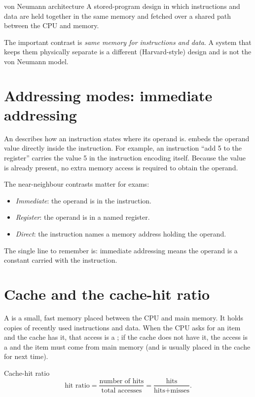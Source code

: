 \begin{definitionbox}{von Neumann architecture}
A stored-program design in which instructions and data are held together in
the same memory and fetched over a shared path between the CPU and memory.
\end{definitionbox}

The important contrast is \emph{same memory for instructions and data}. A
system that keeps them physically separate is a different (Harvard-style)
design and is not the von Neumann model.

\section{Addressing modes: immediate addressing}
An  describes how an instruction states where its
operand is.  embeds the operand value directly
inside the instruction. For example, an instruction ``add 5 to the register''
carries the value 5 in the instruction encoding itself. Because the value is
already present, no extra memory access is required to obtain the operand.

The near-neighbour contrasts matter for exams:
\begin{itemize}
  \item \emph{Immediate}: the operand is in the instruction.
  \item \emph{Register}: the operand is in a named register.
  \item \emph{Direct}: the instruction names a memory address holding the
    operand.
\end{itemize}
The single line to remember is: immediate addressing means the operand is a
constant carried with the instruction.

\section{Cache and the cache-hit ratio}
A  is a small, fast memory placed between the CPU and main memory.
It holds copies of recently used instructions and data. When the CPU asks for
an item and the cache has it, that access is a ; if the cache does not
have it, the access is a  and the item must come from main memory
(and is usually placed in the cache for next time).

\begin{definitionbox}{Cache-hit ratio}
\[
\text{hit ratio} = \frac{\text{number of hits}}{\text{total accesses}}
= \frac{\text{hits}}{\text{hits} + \text{misses}}.
\]
\end{definitionbox}

